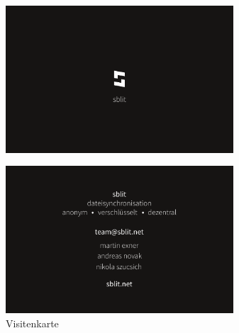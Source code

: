 \documentclass[a4paper,ngerman,naustrian,DIV=12,BCOR=1cm]{scrbook}
\begin{document}
\label{visitenkarte}
\thispagestyle{plain}
\begin{figure}[htb]
   \centering
  \includegraphics[width=85mm,height=55mm]{images/visitenkarte_vorderseite.pdf}
      \\
     \vspace{5mm}

\includegraphics[width=85mm,height=55mm]{images/visitenkarte_rueckseite.pdf}
    \caption{Visitenkarte}
\end{figure}


\printindex{}




\printglossary[type=\acronymtype]
\printglossary
\end{document}
